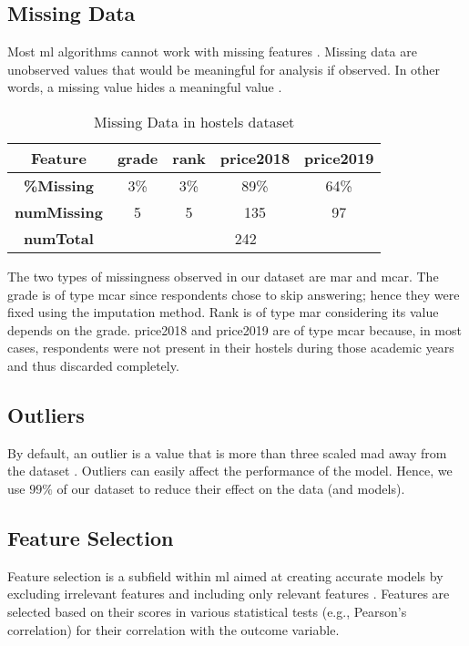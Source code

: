 \begin{sloppypar}
	\subsection{Missing Data}
	Most \ac{ml} algorithms cannot work with missing features \citep{Douglass2020}. Missing data are unobserved values that would be meaningful for analysis if observed. In other words, a missing value hides a meaningful value \citep{little1988}.
	
	\begin{table}[h!]
		\centering
		\caption{Missing Data in hostels dataset}
		\label{table:3}
		\begin{tabular}{|c|cccc|}
			\hline
			\textbf{Feature} & grade & rank & price2018 & price2019 \\ \hline
			\textbf{\%Missing} & 3\% & 3\% & 89\% & 64\% \\
			\textbf{numMissing} & 5 & 5 & 135 & 97 \\ \hline
			\textbf{numTotal} & \multicolumn{4}{|c|}{242} \\ \hline
		\end{tabular}
	\end{table}
	
	\hspace*{-0.6cm}The two types of missingness observed in our dataset are \ac{mar} and \ac{mcar}. The grade is of type \ac{mcar} since respondents chose to skip answering; hence they were fixed using the imputation method. Rank is of type \ac{mar} considering its value depends on the grade. price2018 and price2019 are of type \ac{mcar} because, in most cases, respondents were not present in their hostels during those academic years and thus discarded completely.
	
	\subsection{Outliers}
	By default, an outlier is a value that is more than three scaled \ac{mad} away from the dataset \citep{Mathworks}. Outliers can easily affect the performance of the model\citep{Parashar2021}. Hence, we use $ 99\% $ of our dataset to reduce their effect on the data (and models).
	
	\subsection{Feature Selection} 
	Feature selection is a subfield within \ac{ml} aimed at creating accurate models by excluding irrelevant features and including only relevant features \citep{Jaiantilal2013}. Features are selected based on their scores in various statistical tests (e.g., Pearson's correlation) for their correlation with the outcome variable.
	

\end{sloppypar}

